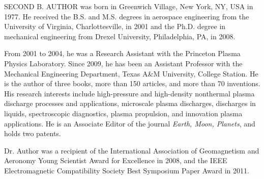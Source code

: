 \documentclass{IEEEoj}
\begin{document}
\begin{IEEEbiography}{SECOND
B. AUTHOR } was born in Greenwich Village, New York, NY, USA in 
1977. He received the B.S. and M.S. degrees in aerospace engineering from 
the University of Virginia, Charlottesville, in 2001 and the Ph.D. degree in 
mechanical engineering from Drexel University, Philadelphia, PA, in 2008.

From 2001 to 2004, he was a Research Assistant with the Princeton Plasma 
Physics Laboratory. Since 2009, he has been an Assistant Professor with the 
Mechanical Engineering Department, Texas A{\&}M University, College Station. 
He is the author of three books, more than 150 articles, and more than 70 
inventions. His research interests include high-pressure and high-density 
nonthermal plasma discharge processes and applications, microscale plasma 
discharges, discharges in liquids, spectroscopic diagnostics, plasma 
propulsion, and innovation plasma applications. He is an Associate Editor of 
the journal \emph{Earth, Moon, Planets}, and holds two patents. 

Dr. Author was a recipient of the International Association of Geomagnetism 
and Aeronomy Young Scientist Award for Excellence in 2008, and the IEEE 
Electromagnetic Compatibility Society Best Symposium Paper Award in 2011. 
\end{IEEEbiography}
\end{document}
